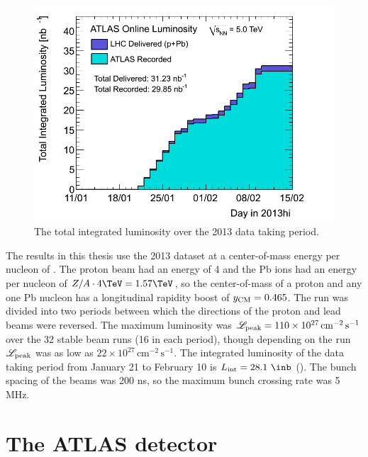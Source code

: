 \begin{figure}[t]
\includegraphics{sumLumiByDayUrgent.png}
\caption{The total integrated luminosity over the 2013 \pPb data taking period.}
\label{fig:int_lumi}
\end{figure}

The results in this thesis use the 2013 \lhc \pPb dataset at a center-of-mass energy per nucleon of \pPbenergy.
The proton beam had an energy of 4 \TeV and the Pb ions had an energy per nucleon of $Z/A \cdot 4 \TeV = 1.57 \TeV$, so the center-of-mass of a proton and any one Pb nucleon has a longitudinal rapidity boost of $y_{\mathrm{CM}} = 0.465$.
The \pPb run was divided into two periods between which the directions of the proton and lead beams were reversed.
The maximum luminosity was $\mathscr{L}_\textrm{peak} = 110 \times 10^{27} \, \textrm{cm}^{-2} \, \textrm{s}^{-1}$ over the 32 stable beam runs (16 in each period), though depending on the run $\mathscr{L}_\textrm{peak}$ was as low as $22 \times 10^{27} \, \textrm{cm}^{-2} \, \textrm{s}^{-1}$.
The integrated luminosity of the data taking period from January 21 to February 10 is $\Lint = 28.1~\inb$ ().
The bunch spacing of the beams was 200 ns, so the maximum bunch crossing rate was 5 MHz.

\section{The ATLAS detector}
\label{sec:atlas}

